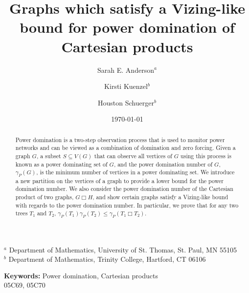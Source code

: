 \documentclass[11pt]{article}
\begin{document}
\title{Graphs which satisfy a Vizing-like bound for power domination of Cartesian products}
\author{
Sarah E. Anderson$^{a}$
\and
Kirsti Kuenzel$^{b}$
\and
Houston Schuerger$^{b}$
}


\date{\today}

\maketitle

\begin{center}
$^a$ Department of Mathematics, University of St. Thomas, St. Paul, MN 55105\\
$^b$ Department of Mathematics, Trinity College, Hartford, CT 06106\\

\end{center}
\vskip15mm
\begin{abstract} 
Power domination is a two-step observation process that is used to monitor power networks and can be viewed as a combination of domination and zero forcing. Given a graph $G$, a subset $S\subseteq V(G)$  that can observe all vertices of $G$ using this process is known as a power dominating set of $G$, and the power domination number of $G$, $\gamma_P(G)$, is the minimum number of vertices in a power dominating set. We introduce a new partition on the vertices of a graph to provide a lower bound for the power domination number. We also consider the power domination number of the Cartesian product of two graphs, $G \Box H$, and show certain graphs satisfy a Vizing-like bound with regards to the power domination number. In particular, we prove that for any two trees $T_1$ and $T_2$, $\gamma_P(T_1)\gamma_P(T_2) \leq \gamma_P(T_1 \Box T_2)$.
\end{abstract}



{\small \textbf{Keywords:} Power domination, Cartesian products} \\
05C69, 05C70
\end{document}
